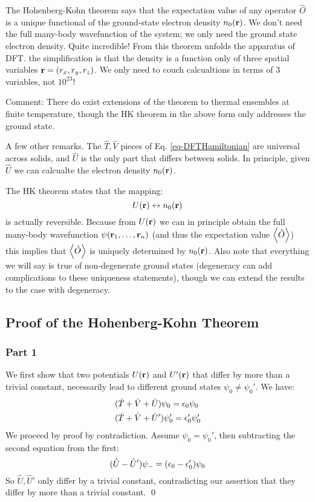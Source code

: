 The Hohenberg-Kohn theorem says that the expectation value of any operator $\hat{O}$ is a unique functional of the ground-state electron density $n_0(\mathbf{r})$. We don't need the full many-body wavefunction of the system; we only need the ground state electron density. Quite incredible! From this theorem unfolds the apparatus of DFT. the simplification is that the density is a function only of three spatial variables $\mathbf{r} = (r_x, r_y, r_z)$. We only need to couch calcualtions in terms of 3 variables, not $10^{23}$!

Comment: There do exist extensions of the theorem to thermal ensembles at finite temperature, though the HK theorem in the above form only addresses the ground state.

A few other remarks. The $\hat{T}, \hat{V}$ pieces of Eq. \eqref{eq-DFTHamiltonian} are universal across solids, and $\hat{U}$ is the only part that differs between solids. In principle, given $\hat{U}$ we can calcualte the electron density $n_0(\mathbf{r})$. 

The HK theorem states that the mapping:
\begin{equation}
    U(\mathbf{r}) \leftrightarrow n_0(\mathbf{r})
\end{equation}
is actually reversible. Because from $U(\mathbf{r})$ we can in principle obtain the full many-body wavefunction $\psi(\mathbf{r}_1, \ldots, \mathbf{r}_n)$ (and thus the expectation value $\left< \hat{O} \right>$) this implies that $\left< \hat{O} \right>$ is uniquely determined by $n_0(\mathbf{r})$. Also note that everything we will say is true of non-degenerate ground states (degeneracy can add complications to these uniqueness statements), though we can extend the results to the case with degeneracy.

\subsection{Proof of the Hohenberg-Kohn Theorem}

\subsubsection{Part 1}
We first show that two potentials $U(\mathbf{r})$ and $U'(\mathbf{r})$ that differ by more than a trivial constant, necessarily lead to different ground states $\psi_0 \neq \psi_0'$. We have:
\begin{equation}
    \begin{split}
        &(\hat{T} + \hat{V} + \hat{U})\psi_0 = \epsilon_0\psi_0
        \\ &(\hat{T} + \hat{V} + \hat{U}')\psi_0' = \epsilon_0'\psi_0'
    \end{split}
\end{equation}
We proceed by proof by contradiction. Assume $\psi_0 = \psi_0'$, then subtracting the second equation from the first:
\begin{equation}
    (\hat{U} - \hat{U}')\psi_- = (\epsilon_0 - \epsilon_0')\psi_0
\end{equation}
So $\hat{U}, \hat{U}'$ only differ by a trivial constant, contradicting our assertion that they differ by more than a trivial constant. \qed

